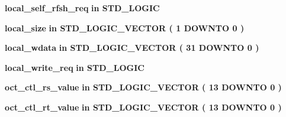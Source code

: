 \begin{DoxyCompactItemize}
\item 
{\bf local\+\_\+self\+\_\+rfsh\+\_\+req}  {\bfseries {\bfseries \textcolor{keywordflow}{in}\textcolor{vhdlchar}{ }}} {\bfseries \textcolor{comment}{S\+T\+D\+\_\+\+L\+O\+G\+IC}\textcolor{vhdlchar}{ }} 
\item 
{\bf local\+\_\+size}  {\bfseries {\bfseries \textcolor{keywordflow}{in}\textcolor{vhdlchar}{ }}} {\bfseries \textcolor{comment}{S\+T\+D\+\_\+\+L\+O\+G\+I\+C\+\_\+\+V\+E\+C\+T\+OR}\textcolor{vhdlchar}{ }\textcolor{vhdlchar}{(}\textcolor{vhdlchar}{ }\textcolor{vhdlchar}{ } \textcolor{vhdldigit}{1} \textcolor{vhdlchar}{ }\textcolor{keywordflow}{D\+O\+W\+N\+TO}\textcolor{vhdlchar}{ }\textcolor{vhdlchar}{ } \textcolor{vhdldigit}{0} \textcolor{vhdlchar}{ }\textcolor{vhdlchar}{)}\textcolor{vhdlchar}{ }} 
\item 
{\bf local\+\_\+wdata}  {\bfseries {\bfseries \textcolor{keywordflow}{in}\textcolor{vhdlchar}{ }}} {\bfseries \textcolor{comment}{S\+T\+D\+\_\+\+L\+O\+G\+I\+C\+\_\+\+V\+E\+C\+T\+OR}\textcolor{vhdlchar}{ }\textcolor{vhdlchar}{(}\textcolor{vhdlchar}{ }\textcolor{vhdlchar}{ } \textcolor{vhdldigit}{31} \textcolor{vhdlchar}{ }\textcolor{keywordflow}{D\+O\+W\+N\+TO}\textcolor{vhdlchar}{ }\textcolor{vhdlchar}{ } \textcolor{vhdldigit}{0} \textcolor{vhdlchar}{ }\textcolor{vhdlchar}{)}\textcolor{vhdlchar}{ }} 
\item 
{\bf local\+\_\+write\+\_\+req}  {\bfseries {\bfseries \textcolor{keywordflow}{in}\textcolor{vhdlchar}{ }}} {\bfseries \textcolor{comment}{S\+T\+D\+\_\+\+L\+O\+G\+IC}\textcolor{vhdlchar}{ }} 
\item 
{\bf oct\+\_\+ctl\+\_\+rs\+\_\+value}  {\bfseries {\bfseries \textcolor{keywordflow}{in}\textcolor{vhdlchar}{ }}} {\bfseries \textcolor{comment}{S\+T\+D\+\_\+\+L\+O\+G\+I\+C\+\_\+\+V\+E\+C\+T\+OR}\textcolor{vhdlchar}{ }\textcolor{vhdlchar}{(}\textcolor{vhdlchar}{ }\textcolor{vhdlchar}{ } \textcolor{vhdldigit}{13} \textcolor{vhdlchar}{ }\textcolor{keywordflow}{D\+O\+W\+N\+TO}\textcolor{vhdlchar}{ }\textcolor{vhdlchar}{ } \textcolor{vhdldigit}{0} \textcolor{vhdlchar}{ }\textcolor{vhdlchar}{)}\textcolor{vhdlchar}{ }} 
\item 
{\bf oct\+\_\+ctl\+\_\+rt\+\_\+value}  {\bfseries {\bfseries \textcolor{keywordflow}{in}\textcolor{vhdlchar}{ }}} {\bfseries \textcolor{comment}{S\+T\+D\+\_\+\+L\+O\+G\+I\+C\+\_\+\+V\+E\+C\+T\+OR}\textcolor{vhdlchar}{ }\textcolor{vhdlchar}{(}\textcolor{vhdlchar}{ }\textcolor{vhdlchar}{ } \textcolor{vhdldigit}{13} \textcolor{vhdlchar}{ }\textcolor{keywordflow}{D\+O\+W\+N\+TO}\textcolor{vhdlchar}{ }\textcolor{vhdlchar}{ } \textcolor{vhdldigit}{0} \textcolor{vhdlchar}{ }\textcolor{vhdlchar}{)}\textcolor{vhdlchar}{ }} 

\end{DoxyCompactItemize}
